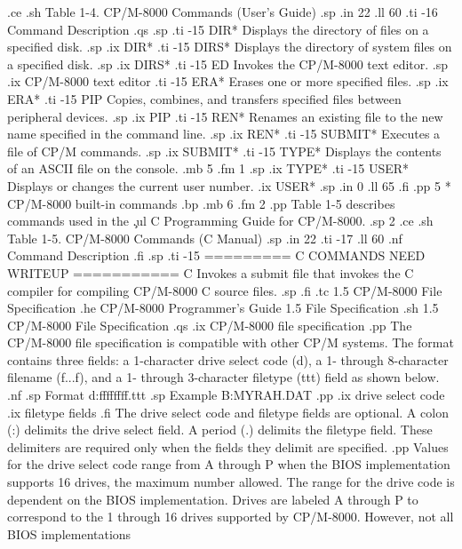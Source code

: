 .ce
.sh
Table 1-4.  CP/M-8000 Commands (User's Guide)
.sp 
.in 22
.ll 60
.ti -16
Command                       Description
.qs
.sp 
.ti -15
DIR*           Displays the directory of files on a specified disk.
.sp
.ix DIR*
.ti -15
DIRS*          Displays the directory of system files on a 
specified disk. 
.sp
.ix DIRS*
.ti -15
ED             Invokes the CP/M-8000 text editor.
.sp
.ix CP/M-8000 text editor
.ti -15
ERA*           Erases one or more specified files.
.sp
.ix ERA*
.ti -15
PIP            Copies, combines, and transfers specified files between 
peripheral devices.
.sp
.ix PIP
.ti -15
REN*           Renames an existing file to the new name specified in the 
command line.
.sp
.ix REN*
.ti -15
SUBMIT*        Executes a file of CP/M commands.
.sp
.ix SUBMIT*
.ti -15
TYPE*          Displays the contents of an ASCII file on the
console. 
.mb 5
.fm 1
.sp    
.ix TYPE*      
.ti -15
USER*          Displays or changes the current user number.
.ix USER*
.sp
.in 0
.ll 65
.fi
.pp 5
* CP/M-8000 built-in commands
.bp
.mb 6
.fm 2
.pp
Table 1-5 describes commands used in the \c
.ul
C Programming Guide for CP/M-8000.
.sp 2
.ce
.sh
Table 1-5.  CP/M-8000 Commands (C Manual)
.sp
.in 22
.ti -17
.ll 60
.nf
Command                        Description
.fi
.sp
.ti -15
========= C COMMANDS NEED WRITEUP ===========
C              Invokes a submit file that invokes the C 
compiler for compiling CP/M-8000 C source files. 
.sp
.fi
.tc    1.5  CP/M-8000 File Specification 
.he CP/M-8000 Programmer's Guide               1.5  File Specification
.sh
1.5  CP/M-8000 File Specification 
.qs
.ix CP/M-8000 file specification
.pp
The CP/M-8000 file specification is compatible with other 
CP/M systems.  The format contains three fields: a 1-character drive 
select code (d), a 1- through 8-character filename (f...f), and 
a 1- through 3-character filetype (ttt) field as shown below.
.nf
.sp
            Format            d:ffffffff.ttt
.sp
            Example           B:MYRAH.DAT
.pp
.ix drive select code
.ix filetype fields
.fi
The drive select code and filetype fields are optional.  A
colon (:) delimits the drive select field.  A period (.)
delimits the filetype field.  These delimiters are required only when
the fields they delimit are specified. 
.pp
Values for the drive select code range from A through P
when the BIOS implementation supports 16 drives, the maximum 
number allowed.  The range for 
the drive code is dependent on the BIOS implementation.  Drives
are labeled A through P to correspond to the 1 through 16 drives
supported by CP/M-8000.  However, not all BIOS implementations 
